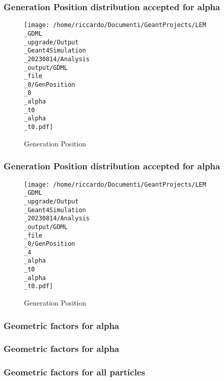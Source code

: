 \documentclass[8pt]{beamer}
\begin{document}
            \begin{frame}
                \frametitle{Generation Position distribution accepted for alpha}
            
        \begin{figure}[h]
            \centering
            \texttt{[image: /home/riccardo/Documenti/GeantProjects/LEM\\\_GDML\\\_upgrade/Output\\\_Geant4Simulation\\\_20230814/Analysis\\\_output/GDML\\\_file\\\_0/GenPosition\\\_0\\\_alpha\\\_t0\\\_alpha\\\_t0.pdf]}
            \caption{Generation Position}
        \end{figure}
        
            \end{frame}
            
            \begin{frame}
                \frametitle{Generation Position distribution accepted for alpha}
            
        \begin{figure}[h]
            \centering
            \texttt{[image: /home/riccardo/Documenti/GeantProjects/LEM\\\_GDML\\\_upgrade/Output\\\_Geant4Simulation\\\_20230814/Analysis\\\_output/GDML\\\_file\\\_0/GenPosition\\\_4\\\_alpha\\\_t0\\\_alpha\\\_t0.pdf]}
            \caption{Generation Position}
        \end{figure}
        
            \end{frame}
            
            \begin{frame}
                \frametitle{Geometric factors for alpha}
            
            \end{frame}
            
            \begin{frame}
                \frametitle{Geometric factors for alpha}
            
            \end{frame}
            
            \begin{frame}
                \frametitle{Geometric factors for all particles}
            
            \end{frame}
            
        
\end{document}
